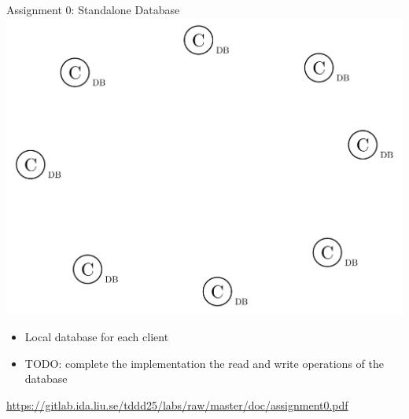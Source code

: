 \documentclass[compress,xcolor=table]{beamer}
\begin{document}
\begin{frame}{Assignment 0: Standalone Database}
  \centering
  \includegraphics[scale=0.10,page=1]{include/assets/standalone-agents}
  \vspace{0.5em}
  \begin{itemize}
    \item Local database for each client
    \item \alert{TODO}: complete the implementation the read and write operations of the database
  \end{itemize}
  \begin{center}
    \scriptsize \url{https://gitlab.ida.liu.se/tddd25/labs/raw/master/doc/assignment0.pdf}
  \end{center}
\end{frame}
\end{document}
